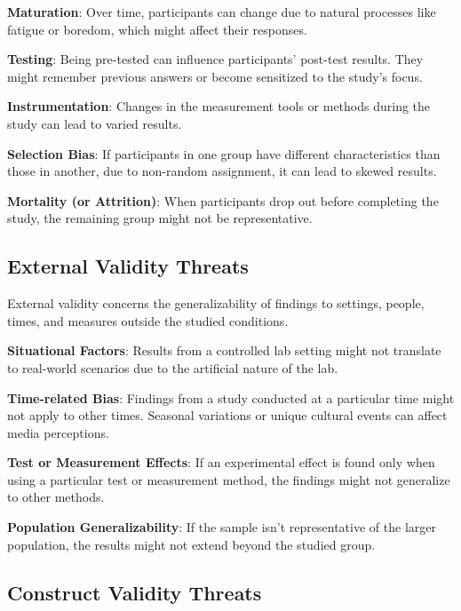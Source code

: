 \documentclass[
  b5paper]{book}
\begin{document}
\textbf{Maturation}: Over time, participants can change due to natural processes like fatigue or boredom, which might affect their responses.

\textbf{Testing}: Being pre-tested can influence participants' post-test results. They might remember previous answers or become sensitized to the study's focus.

\textbf{Instrumentation}: Changes in the measurement tools or methods during the study can lead to varied results.

\textbf{Selection Bias}: If participants in one group have different characteristics than those in another, due to non-random assignment, it can lead to skewed results.

\textbf{Mortality (or Attrition)}: When participants drop out before completing the study, the remaining group might not be representative.

\hypertarget{external-validity-threats}{%
\subsection*{External Validity Threats}\label{external-validity-threats}}

External validity concerns the generalizability of findings to settings, people, times, and measures outside the studied conditions.

\textbf{Situational Factors}: Results from a controlled lab setting might not translate to real-world scenarios due to the artificial nature of the lab.

\textbf{Time-related Bias}: Findings from a study conducted at a particular time might not apply to other times. Seasonal variations or unique cultural events can affect media perceptions.

\textbf{Test or Measurement Effects}: If an experimental effect is found only when using a particular test or measurement method, the findings might not generalize to other methods.

\textbf{Population Generalizability}: If the sample isn't representative of the larger population, the results might not extend beyond the studied group.

\hypertarget{construct-validity-threats}{%
\subsection*{Construct Validity Threats}\label{construct-validity-threats}}
\end{document}
